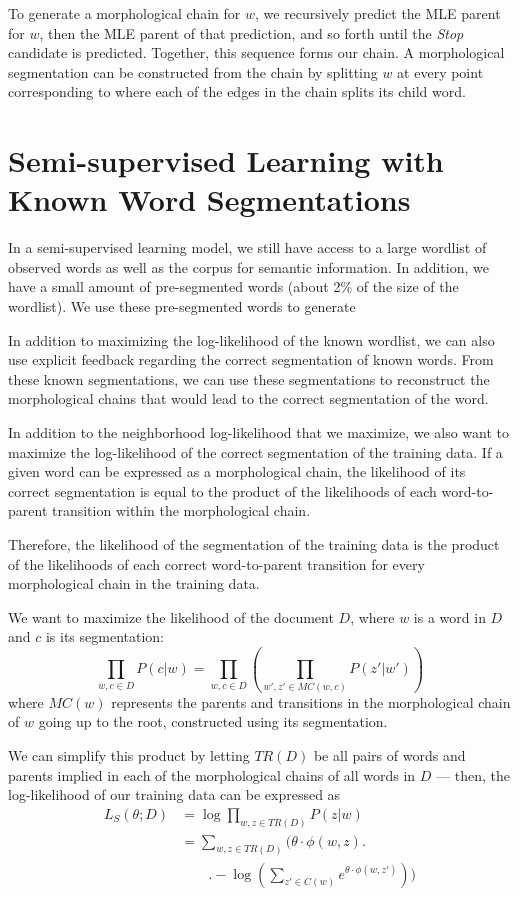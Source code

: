\documentclass[11pt,twocolumn]{article}
\begin{document}
To generate a morphological chain for $w$, we recursively predict the MLE parent for $w$, then the MLE parent of that prediction, and so forth until the \emph{Stop} candidate is predicted. Together, this sequence forms our chain. A morphological segmentation can be constructed from the chain by splitting $w$ at every point corresponding to where each of the edges in the chain splits its child word.

\section{Semi-supervised Learning with Known Word Segmentations}
In a semi-supervised learning model, we still have access to a large wordlist of observed words as well as the corpus for semantic information. In addition, we have a small amount of pre-segmented words (about 2\% of the size of the wordlist). We use these pre-segmented words to generate

In addition to maximizing the log-likelihood of the known wordlist,
we can also use explicit feedback regarding the correct segmentation of known words.
From these known segmentations, we can use these segmentations to reconstruct
the morphological chains that would lead to the correct segmentation of the word.

In addition to the neighborhood log-likelihood that we maximize,
we also want to maximize the log-likelihood of the correct segmentation of the training data.
If a given word can be expressed as a morphological chain, the likelihood of its correct segmentation
is equal to the product of the likelihoods of each word-to-parent transition within the morphological chain.

Therefore, the likelihood of the segmentation of the training data is the product of the likelihoods
of each correct word-to-parent transition for every morphological chain in the training data.

We want to maximize the likelihood of the document $D$, where $w$ is a word in $D$ and $c$ is
its segmentation:
\begin{equation}
    \prod_{w, c \in D} P(c | w) = \prod_{w, c \in D}\left(\prod_{w', z' \in MC(w, c)} P(z' | w')\right)
\end{equation}
where $MC(w)$ represents the parents and transitions in the morphological chain of $w$ going up to the root,
constructed using its segmentation.

We can simplify this product by letting $TR(D)$ be all pairs of words and parents implied in each of
the morphological chains of all words in $D$ ---
then, the log-likelihood of our training data can be expressed as
\begin{equation}
    \begin{split}
        L_S(\theta; D) &= \log{\prod_{w, z \in TR(D)} P(z|w)} \\
                       &= \sum_{w, z \in TR(D)} \Bigg(\theta \cdot \phi(w, z) \Bigg. \\
                       &\qquad\Bigg. - \log\left(\sum_{z' \in C(w)} e^{\theta \cdot \phi(w, z')} \right)\Bigg)
   \end{split}
\end{equation}
\end{document}
